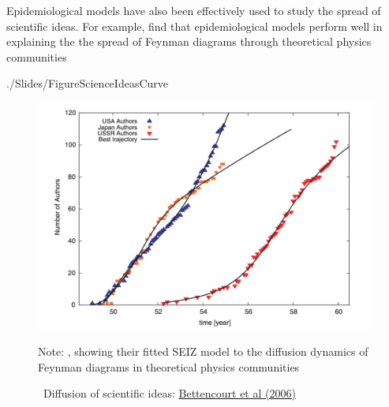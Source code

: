 Epidemiological models have also been effectively used to study the spread of scientific ideas.    For example,   find that epidemiological models perform well in explaining the the spread of Feynman diagrams through theoretical physics communities%

\begin{verbatimwrite}{./Slides/FigureScienceIdeasCurve}
  \begin{figure}[!ht] \centering
    \caption{ ~Diffusion of scientific ideas: \href{http://web.mit.edu/dikaiser/www/BAKC.PhysA.pdf}{Bettencourt et al (2006)}}\nocite{bettencourt2006power}
    \label{fig:science_ideas_curve}
    \centerline{\includegraphics[width=\textwidth]{./figures/Feynman}}
    \begin{flushleft}{\footnotesize Note: \cite{bettencourt2006power}, showing their fitted SEIZ model to the diffusion dynamics of Feynman diagrams in theoretical physics communities}
    \end{flushleft}
  \end{figure}
\end{verbatimwrite}
\ifInBook{}{
}

